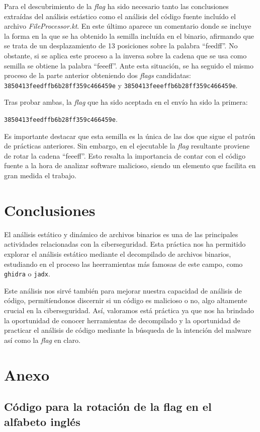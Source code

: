 \documentclass[]{article}
\begin{document}
Para el descubrimiento de la \textit{flag} ha sido necesario tanto las
conclusiones extraídas del análisis estástico como el análisis del código
fuente incluído el archivo \textit{FileProcessor.kt}. En este último aparece un
comentario donde se incluye la forma en la que se ha obtenido la semilla
incluída en el binario, afirmando que se trata de un desplazamiento de 13
posiciones sobre la palabra ``feedff''. No obstante, si se aplica este proceso
a la inversa sobre la cadena que se usa como semilla se obtiene la palabra
``feeeff''. Ante esta situación, se ha seguido el mismo proceso de la parte
anterior obteniendo dos \textit{flags} candidatas:
\texttt{3850413feedffb6b28ff359c466459e} y
\texttt{3850413feeeffb6b28ff359c466459e}. 

Tras probar ambas, la \textit{flag} que ha sido aceptada en el envío ha sido la
primera: 

\noindent
\texttt{3850413feedffb6b28ff359c466459e}. 

Es importante destacar que esta semilla es la única de las dos que sigue el
patrón de prácticas anteriores. Sin embargo, en el ejecutable la \textit{flag}
resultante proviene de rotar la cadena ``feeeff''. Esto resalta la importancia
de contar con el código fuente a la hora de analizar software malicioso, siendo
un elemento que facilita en gran medida el trabajo.

\section{Conclusiones}
\label{sec:conclusion}
El análisis estático y dinámico de archivos binarios es una de las principales
actividades relacionadas con la ciberseguridad. Esta práctica nos ha permitido
explorar el análisis estático mediante el decompilado de archivos binarios,
estudiando en el proceso las heerramientas más famosas de este campo, como
\texttt{ghidra} o \texttt{jadx}.

Este análisis nos sirvé también para mejorar nuestra capacidad de análisis de
código, permitíendonos discernir si un código es malicioso o no, algo altamente
crucial en la ciberseguridad. Así, valoramos está práctica ya que nos ha
brindado la oportunidad de conocer herramientas de decompilado y la oportunidad
de practicar el análisis de código mediante la búsqueda de la intención del
malware así como la \textit{flag} en claro.

\newpage
{}
\section*{Anexo}

\label{anexo}
\subsection*{Código para la rotación de la flag en el alfabeto inglés}
\lstset{style=python}

\end{document}
